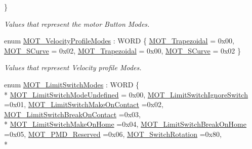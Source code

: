 \begin{DoxyCompactItemize}
 \}\begin{DoxyCompactList}\small\item\em Values that represent the motor Button Modes. \end{DoxyCompactList}
\item 
enum \hyperlink{group___common_gaa69399e5492d572d7976b386dbcb3ffe}{M\+O\+T\+\_\+\+Velocity\+Profile\+Modes} \+: W\+O\+RD \{ \hyperlink{group___common_ggaa69399e5492d572d7976b386dbcb3ffeaef4a0a65efa2f222f26230b3bb4d2955}{M\+O\+T\+\_\+\+Trapezoidal} = 0x00, 
\hyperlink{group___common_ggaa69399e5492d572d7976b386dbcb3ffeaac0bce9cdce654090991ff0b76f89f27}{M\+O\+T\+\_\+\+S\+Curve} = 0x02, 
\hyperlink{group___common_ggaa69399e5492d572d7976b386dbcb3ffeaef4a0a65efa2f222f26230b3bb4d2955}{M\+O\+T\+\_\+\+Trapezoidal} = 0x00, 
\hyperlink{group___common_ggaa69399e5492d572d7976b386dbcb3ffeaac0bce9cdce654090991ff0b76f89f27}{M\+O\+T\+\_\+\+S\+Curve} = 0x02
 \}\begin{DoxyCompactList}\small\item\em Values that represent Velocity profile Modes. \end{DoxyCompactList}
\item 
enum \hyperlink{group___common_ga682c3ff98dc472fbdc3cbc3267d38796}{M\+O\+T\+\_\+\+Limit\+Switch\+Modes} \+: W\+O\+RD \{ \\*
\hyperlink{group___common_gga682c3ff98dc472fbdc3cbc3267d38796a5d1c87f59088fb4c61890ee9f7e396d8}{M\+O\+T\+\_\+\+Limit\+Switch\+Mode\+Undefined} = 0x00, 
\hyperlink{group___common_gga682c3ff98dc472fbdc3cbc3267d38796a4597f8cb8699917b05a17043355b6b4e}{M\+O\+T\+\_\+\+Limit\+Switch\+Ignore\+Switch} =0x01, 
\hyperlink{group___common_gga682c3ff98dc472fbdc3cbc3267d38796a71019889786145d78d206ebfe8532582}{M\+O\+T\+\_\+\+Limit\+Switch\+Make\+On\+Contact} =0x02, 
\hyperlink{group___common_gga682c3ff98dc472fbdc3cbc3267d38796a8ede426a957ea9aaccb56eb9fbdd65f3}{M\+O\+T\+\_\+\+Limit\+Switch\+Break\+On\+Contact} =0x03, 
\\*
\hyperlink{group___common_gga682c3ff98dc472fbdc3cbc3267d38796a6befefb68076e7c2ebd3a3174857d814}{M\+O\+T\+\_\+\+Limit\+Switch\+Make\+On\+Home} =0x04, 
\hyperlink{group___common_gga682c3ff98dc472fbdc3cbc3267d38796a0f7d30a1b18750e5d8d959c05ff16815}{M\+O\+T\+\_\+\+Limit\+Switch\+Break\+On\+Home} =0x05, 
\hyperlink{group___common_gga682c3ff98dc472fbdc3cbc3267d38796a4da0cb79d5cc0720c05912f0341b9365}{M\+O\+T\+\_\+\+P\+M\+D\+\_\+\+Reserved} =0x06, 
\hyperlink{group___common_gga682c3ff98dc472fbdc3cbc3267d38796a1940ea78ff85f568ed44abc65aa17e09}{M\+O\+T\+\_\+\+Switch\+Rotation} =0x80, 
\\*

\end{DoxyCompactItemize}
